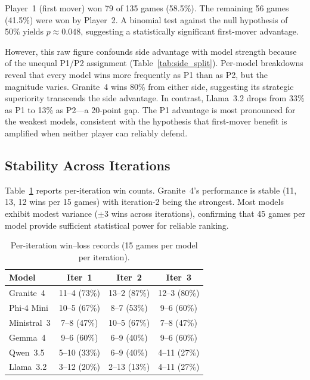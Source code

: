 \documentclass[11pt]{article}
\begin{document}
Player~1 (first mover) won 79 of 135 games (58.5\%). The remaining 56 games (41.5\%) were won by Player~2. A binomial test against the null hypothesis of 50\% yields $p \approx 0.048$, suggesting a statistically significant first-mover advantage.

However, this raw figure confounds side advantage with model strength because of the unequal P1/P2 assignment (Table~\ref{tab:side_split}). Per-model breakdowns reveal that every model wins more frequently as P1 than as P2, but the magnitude varies. Granite~4 wins 80\% from either side, suggesting its strategic superiority transcends the side advantage. In contrast, Llama~3.2 drops from 33\% as P1 to 13\% as P2---a 20-point gap. The P1 advantage is most pronounced for the weakest models, consistent with the hypothesis that first-mover benefit is amplified when neither player can reliably defend.

\subsection{Stability Across Iterations}

Table~\ref{tab:iterations} reports per-iteration win counts. Granite~4's performance is stable (11, 13, 12 wins per 15 games) with iteration-2 being the strongest. Most models exhibit modest variance ($\pm 3$ wins across iterations), confirming that 45 games per model provide sufficient statistical power for reliable ranking.

\begin{table}[H]
\centering
\caption{Per-iteration win--loss records (15 games per model per iteration).}
\label{tab:iterations}
\begin{tabular}{lccc}
\toprule
\textbf{Model} & \textbf{Iter~1} & \textbf{Iter~2} & \textbf{Iter~3} \\
\midrule
Granite~4   & 11--4 (73\%) & 13--2 (87\%) & 12--3 (80\%) \\
Phi-4 Mini  & 10--5 (67\%) &  8--7 (53\%) &  9--6 (60\%) \\
Ministral~3 &  7--8 (47\%) & 10--5 (67\%) &  7--8 (47\%) \\
Gemma~4     &  9--6 (60\%) &  6--9 (40\%) &  9--6 (60\%) \\
Qwen~3.5    &  5--10 (33\%) &  6--9 (40\%) &  4--11 (27\%) \\
Llama~3.2   &  3--12 (20\%) &  2--13 (13\%) &  4--11 (27\%) \\
\bottomrule
\end{tabular}
\end{table}
\end{document}
